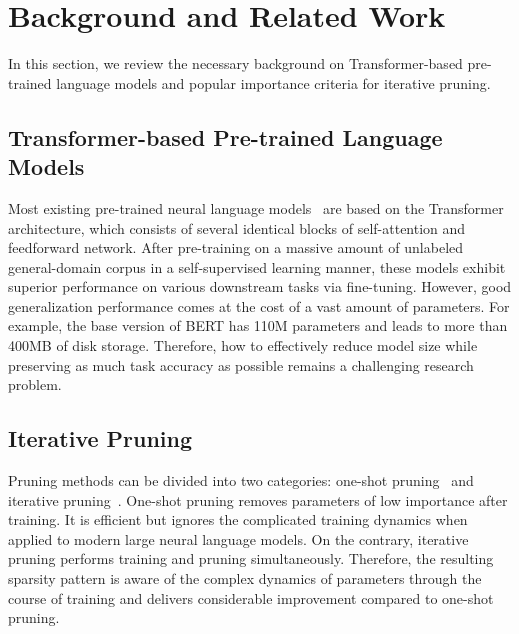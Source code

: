 \section{Background and Related Work}
In this section, we review the necessary background on Transformer-based pre-trained language models and popular importance criteria for iterative pruning.
\subsection{Transformer-based Pre-trained Language Models}
Most existing pre-trained neural language models~\cite{gpt2,bert,minilm,electra} are based on the Transformer~\cite{transformer} architecture, which consists of several identical blocks of self-attention and feedforward network. After pre-training on a massive amount of unlabeled general-domain corpus in a self-supervised learning manner, these models exhibit superior performance on various downstream tasks via fine-tuning. However, good generalization performance comes at the cost of a vast amount of parameters. For example, the base version of BERT has 110M parameters and leads to more than 400MB of disk storage. Therefore, how to effectively reduce model size while preserving as much task accuracy as possible remains a challenging research problem.
\subsection{Iterative Pruning}
Pruning methods can be divided into two categories: one-shot pruning~\cite{oneshot1,oneshot2} and iterative pruning~\cite{l0,movement,platon}. One-shot pruning removes parameters of low importance after training. It is efficient but ignores the complicated training dynamics when applied to modern large neural language models. On the contrary, iterative pruning performs training and pruning simultaneously. Therefore, the resulting sparsity pattern is aware of the complex dynamics of parameters through the course of training and delivers considerable improvement compared to one-shot pruning.

